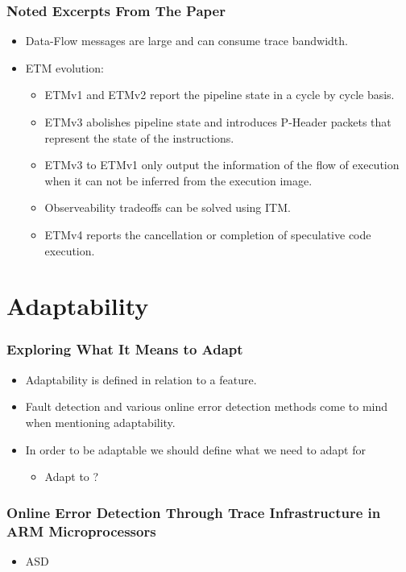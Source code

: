 \documentclass{beamer}
\begin{document}
\begin{frame}
    \frametitle{Noted Excerpts From The Paper}
    \begin{itemize}
        \item Data-Flow messages are large and can consume trace bandwidth.
        \item ETM evolution:
            \begin{itemize}
                \item ETMv1 and ETMv2 report the pipeline state in a cycle by
                    cycle basis.
                \item ETMv3 abolishes pipeline state and introduces P-Header
                    packets that represent the state of the instructions.
                \item ETMv3 to ETMv1 only output the information of the flow of
                    execution when it can not be inferred from the execution
                    image.
                \item Observeability tradeoffs can be solved using ITM.
                \item ETMv4 reports the cancellation or completion of
                    speculative code execution.
            \end{itemize}
    \end{itemize}
\end{frame}
\section{Adaptability}
\begin{frame}
    \frametitle{Exploring What It Means to Adapt}
    \begin{itemize}
        \item Adaptability is defined in relation to a feature.
        \item Fault detection and various online error detection methods come
            to mind when mentioning adaptability.
        \item In order to be adaptable we should define what we need to adapt
            for
            \begin{itemize}
                \item Adapt to ?
            \end{itemize}
    \end{itemize}
\end{frame}
\begin{frame}
    \frametitle{Online Error Detection Through Trace Infrastructure in
    ARM Microprocessors}
    \begin{itemize}
        \item ASD
    \end{itemize}
\end{frame}
\end{document}
